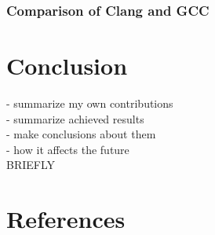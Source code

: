 \documentclass[12pt]{article}
\begin{document}
\subsubsection{Comparison of Clang and GCC}


\newpage
\section{Conclusion}

\color{red}
- summarize my own contributions \\
- summarize achieved results \\
- make conclusions about them \\
- how it affects the future \\
BRIEFLY
\color{black}


\newpage
\section{References}
\end{document}
